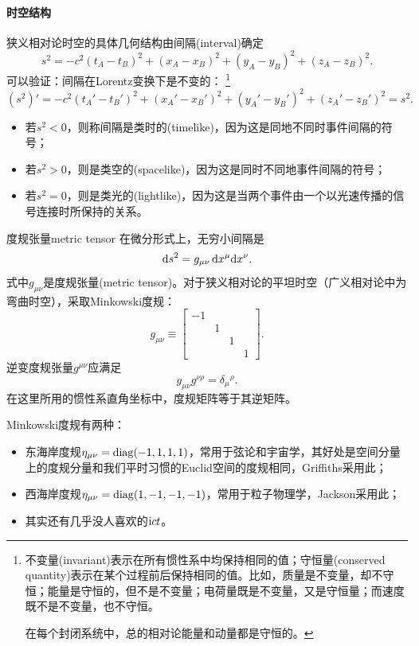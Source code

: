 \paragraph{时空结构}

狭义相对论时空的具体几何结构由间隔(interval)确定
\begin{equation}
    \label{eq:ed-invariant-interval}
    s^2 = -c^2(t_A - t_B)^2 + (x_A - x_B)^2 + (y_A - y_B)^2 + (z_A - z_B)^2.
\end{equation}
可以验证：间隔在Lorentz变换下是不变的：
\footnote{
不变量(invariant)表示在所有惯性系中均保持相同的值；守恒量(conserved quantity)表示在某个过程前后保持相同的值。比如，质量是不变量，却不守恒；能量是守恒的，但不是不变量；电荷量既是不变量，又是守恒量；而速度既不是不变量，也不守恒。

在每个封闭系统中，总的相对论能量和动量都是守恒的。
}
\[
    (s^2)' = -c^2(t_A' - t_B')^2 + (x_A' - x_B')^2 + (y_A' - y_B')^2 + (z_A' - z_B')^2 = s^2.
\]
\begin{itemize}
    \item 若$s^2 < 0$，则称间隔是类时的(timelike)，因为这是同地不同时事件间隔的符号；
    \item 若$s^2 > 0$，则是类空的(spacelike)，因为这是同时不同地事件间隔的符号；
    \item 若$s^2 = 0$，则是类光的(lightlike)，因为这是当两个事件由一个以光速传播的信号连接时所保持的关系。
\end{itemize}
\begin{definition}
    {度规张量}{metric tensor}
    在微分形式上，无穷小间隔是
    \begin{equation}
        \mathop{}\!\mathrm{d} s^2 = g_{\mu\nu}\mathop{}\!\mathrm{d} x^\mu\mathrm{d} x^\nu.
    \end{equation}
    式中$g_{\mu\nu}$是度规张量(metric tensor)。对于狭义相对论的平坦时空（广义相对论中为弯曲时空），采取Minkowski度规：
    \begin{equation}
        g_{\mu\nu} \equiv
        \begin{bmatrix}
            -1\\ &1\\ &&1\\ &&&1
        \end{bmatrix}.
    \end{equation}
    逆变度规张量$g^{\mu\nu}$应满足
    \begin{equation}
        g_{\mu\nu}g^{\nu\rho} = \delta_\mu{}^\rho.
    \end{equation}
    在这里所用的惯性系直角坐标中，度规矩阵等于其逆矩阵。
\end{definition}
\begin{remark}
    Minkowski度规有两种：
    \begin{itemize}
        \item 东海岸度规$\eta_{\mu\nu} = \operatorname{diag}(-1,1,1,1)$，常用于弦论和宇宙学，其好处是空间分量上的度规分量和我们平时习惯的Euclid空间的度规相同，Griffiths采用此；
        \item 西海岸度规$\eta_{\mu\nu} = \operatorname{diag}(1,-1,-1,-1)$，常用于粒子物理学，Jackson采用此；
        \item 其实还有几乎没人喜欢的$\mathrm{i} ct$。
    \end{itemize}
\end{remark}

